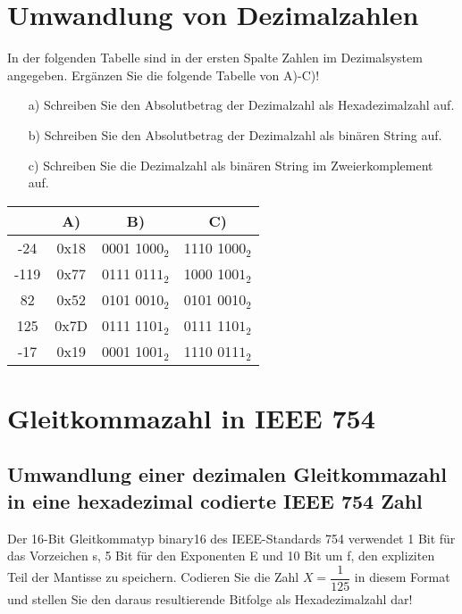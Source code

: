 \documentclass[paper=a4, fontsize=11pt]{scrartcl}
\numberwithin{equation}{section}
\numberwithin{figure}{section}
\numberwithin{table}{section}
\begin{document}
\section{Umwandlung von Dezimalzahlen}
In der folgenden Tabelle sind in der ersten Spalte Zahlen im Dezimalsystem angegeben. Ergänzen Sie die folgende Tabelle von A)-C)!

\begin{itemize}
\item[a)] Schreiben Sie den Absolutbetrag der Dezimalzahl als Hexadezimalzahl auf.
\item[b)] Schreiben Sie den Absolutbetrag der Dezimalzahl als binären String auf. 
\item[c)] Schreiben Sie die Dezimalzahl als binären String im Zweierkomplement auf.
\end{itemize}

\begin{tabular}{|c|c|c|c|}
\hline
 & A) & B) & C) \\
\hline 
-24 & 0x18 & 0001 100$0_{2}$ & 1110 100$0_{2}$ \\
\hline
-119  & 0x77 & 0111 011$1_{2}$ & 1000 100$1_{2}$ \\
\hline
82   & 0x52 & 0101 001$0_{2}$ & 0101 001$0_{2}$ \\
\hline
125  & 0x7D & 0111 110$1_{2}$ & 0111 110$1_{2}$ \\
\hline
-17   & 0x19 & 0001 100$1_{2}$ & 1110 011$1_{2}$ \\
\hline
\end{tabular}

\section{Gleitkommazahl in IEEE 754 }
\subsection{Umwandlung einer dezimalen Gleitkommazahl in eine hexadezimal codierte IEEE 754 Zahl}
Der 16-Bit Gleitkommatyp binary16 des IEEE-Standards 754 verwendet 1 Bit für das Vorzeichen s, 5 Bit für den Exponenten E und 10 Bit um f, den expliziten Teil der Mantisse zu speichern. Codieren Sie die Zahl $X=\dfrac{1}{125}$ in diesem Format und stellen Sie den daraus resultierende Bitfolge als Hexadezimalzahl dar! \\
\end{document}
